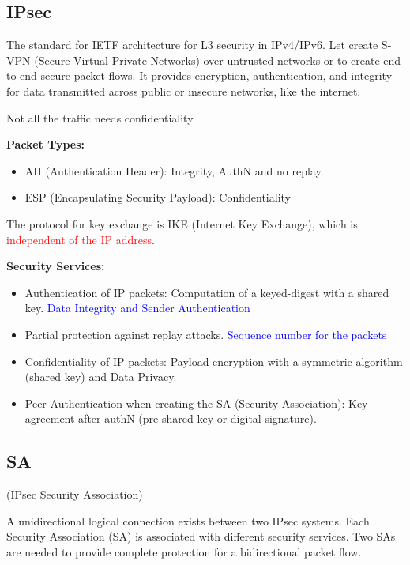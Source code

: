 \hfill
\begin{center}
    \section{IPsec}
\end{center}
The standard for IETF architecture for L3 security in IPv4/IPv6. Let create S-VPN (Secure Virtual Private Networks) over untrusted networks or to create end-to-end secure packet flows. It provides encryption, authentication, and integrity for data transmitted across public or insecure networks, like the internet.

\hfill

\begin{tcolorbox}[colback=blue!10!white, colframe=blue!50!white, title=Reminder] 
    Not all the traffic needs confidentiality.
\end{tcolorbox}

\hfill

\textbf{Packet Types:}
\begin{itemize}
    \item AH (Authentication Header): Integrity, AuthN and no replay.
    \item ESP (Encapsulating Security Payload): Confidentiality
\end{itemize}

The protocol for key exchange is IKE (Internet Key Exchange), which is \textcolor{red}{independent of the IP address}.

\hfill 

\textbf{Security Services:}
\begin{itemize}
    \item Authentication of IP packets: Computation of a keyed-digest with a shared key. \textcolor{Blue}{Data Integrity and Sender Authentication}
    \item Partial protection against replay attacks. \textcolor{Blue}{Sequence number for the packets}
    \item Confidentiality of IP packets: Payload encryption with a symmetric algorithm (shared key) and Data Privacy.
    \item Peer Authentication when creating the SA (Security Association): Key agreement after authN (pre-shared key or digital signature).
\end{itemize}

\subsection{SA}
\begin{center}
    (IPsec Security Association)
\end{center}
A unidirectional logical connection exists between two IPsec systems. Each Security Association (SA) is associated with different security services. Two SAs are needed to provide complete protection for a bidirectional packet flow.


